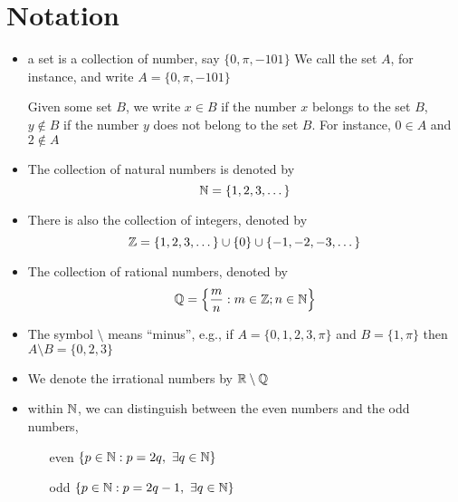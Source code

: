 \section{Notation}
\begin{itemize}
  \item a set is a collection of number, say $\{0, \pi, -101\}$
  We call the set $A$, for instance, and write $A = \{0, \pi, -101\}$

  Given some set $B$, we write $x\in B$ if the number $x$ belongs to the set $B$, 
  $y \notin B$ if the number $y$ does not belong to the set $B$. 
  For instance, $0 \in A$ and $2 \notin A$
  \item The collection of natural numbers is denoted by
  \[\mathbb N = \{1, 2, 3, \dotsc\}\]
  \item There is also the collection of integers, denoted by
  \[\mathbb Z = \{1, 2, 3, \dotsc\} \cup \{0\} \cup \{-1, -2, -3, \dotsc\}\]
  \item The collection of rational numbers, denoted by
  \[\mathbb Q = \left\{\frac{m}{n} : m \in \mathbb Z; n \in \mathbb N\right\}\]
  \item The symbol $\setminus$ means ``minus'', e.g., if $A = \{0, 1, 2, 3, \pi\}$ and $B = \{1, \pi\}$ then $A \setminus B = \{0, 2, 3\}$
  \item We denote the irrational numbers by $\mathbb R \setminus \mathbb Q$
  \item within $\mathbb N$, we can distinguish between the even numbers and the odd numbers, 
  \begin{enumerate}
    \item[even] $\{p\in\mathbb N : p = 2q,\ \exists q \in \mathbb N\}$
    \item[odd] $\{p\in\mathbb N : p = 2q-1,\ \exists q \in \mathbb N\}$
  \end{enumerate}
\end{itemize}